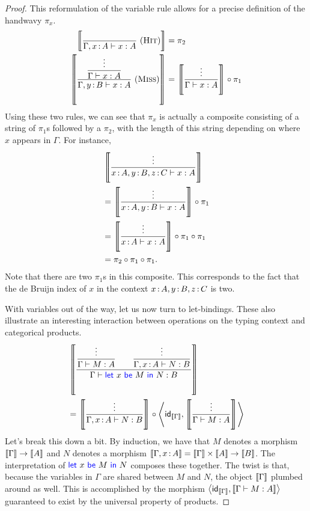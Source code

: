 \begin{proof}
  This reformulation of the variable rule allows for a precise
  definition of the handwavy \(\pi_x\).
  \begin{align}
    \left\llbracket 
      \frac
        {~}
        {\Gamma,x\,{:}\, A \vdash x : A}
        ~(\textsc{Hit})
    \right\rrbracket
    &= \pi_2
    \\
    \left\llbracket 
      \frac
        {\displaystyle\frac{\vdots}{\Gamma \vdash x : A}}
        {\Gamma,y\,{:}\, B \vdash x : A}
        ~(\textsc{Miss})
    \right\rrbracket
    &=
    \left\llbracket 
      \frac{\vdots}{\Gamma \vdash x : A}
    \right\rrbracket
    \circ \pi_1
  \end{align}
  Using these two rules,
  we can see that \(\pi_x\) is actually a composite consisting of a string of \(\pi_1\)s followed by a \(\pi_2\),
  with the length of this string depending on where \(x\) appears in \(\Gamma\). For instance,
  \begin{align}
    &\left\llbracket \frac{\vdots}{x\,{:}\, A, y\,{:}\, B, z\,{:}\, C \vdash x : A}\right\rrbracket \\
    &=
    \left\llbracket \frac{\vdots}{x\,{:}\, A, y\,{:}\, B \vdash x : A}\right\rrbracket \circ \pi_1 \\
    &=
    \left\llbracket \frac{\vdots}{x\,{:}\, A \vdash x : A}\right\rrbracket \circ \pi_1 \circ \pi_1 \\
    &=
    \pi_2 \circ \pi_1 \circ \pi_1.
  \end{align}
  Note that there are two \(\pi_1\)s in this composite. This corresponds to the fact that
  the de Bruijn index of \(x\) in the context \(x\,{:}\, A,y\,{:}\, B,z\,{:}\, C\) is two.

  With variables out of the way, let us now turn to let-bindings.
  These also illustrate an interesting interaction
  between operations on the typing context and categorical products.
  \begin{align*}
    &\left\llbracket 
      \frac
      {
        \displaystyle\frac{\vdots}{\Gamma\vdash M : A}
        \qquad
        \displaystyle\frac{\vdots}{\Gamma,x\,{:}\, A\vdash N : B}
      }
      {\Gamma\vdash \mathsf{{\color{blue}let}}~x~\mathsf{{\color{blue}be}}~M~\mathsf{{\color{blue}in}}~N : B}
    \right\rrbracket
    \\
    &=
    \left\llbracket \frac{\vdots}{\Gamma,x\,{:}\, A \vdash N : B}\right\rrbracket
    \circ
    \left\langle
    \mathsf{id}_{\left\llbracket \Gamma\right\rrbracket}
    ,
    \left\llbracket \frac{\vdots}{\Gamma\vdash M : A}\right\rrbracket
    \right\rangle
  \end{align*}
  Let's break this down a bit.
  By induction, we have that
  \(M\) denotes a morphism \(\left\llbracket \Gamma\right\rrbracket \to \left\llbracket A\right\rrbracket\)
  and \(N\) denotes a morphism \(\left\llbracket \Gamma,x\,{:}\, A\right\rrbracket = \left\llbracket \Gamma\right\rrbracket\times\left\llbracket A\right\rrbracket \to \left\llbracket B\right\rrbracket\).
  The interpretation of \(\mathsf{{\color{blue}let}}~x~\mathsf{{\color{blue}be}}~M~\mathsf{{\color{blue}in}}~N\)
  composes these together. The twist is that,
  because the variables in \(\Gamma\) are shared between \(M\)
  and \(N\), the object \(\left\llbracket \Gamma\right\rrbracket\)
  plumbed around as well.
  This is accomplished by the morphism
  \(
    \left\langle
    \mathsf{id}_{\left\llbracket \Gamma\right\rrbracket}
    ,
    \left\llbracket \Gamma\vdash M : A\right\rrbracket
    \right\rangle\)
    guaranteed to exist
    by the universal property of products.


\end{proof}
